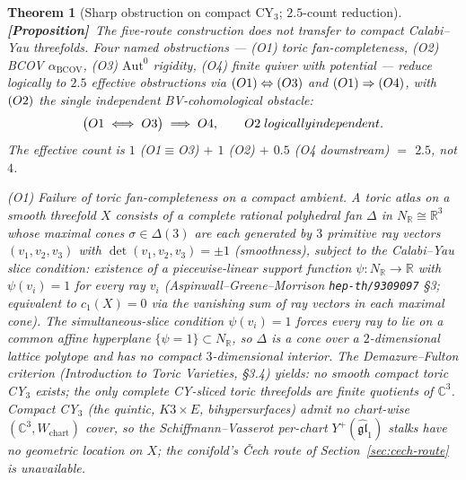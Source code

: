\documentclass[11pt]{amsart}
\newtheorem{theorem}{Theorem}[section]
\theoremstyle{definition}
\providecommand{\bR}{\mathbb{R}}
\providecommand{\bC}{\mathbb{C}}
\providecommand{\fgl}{\mathfrak{gl}}
\providecommand{\ClaimStatusProposition}{\textbf{\textsf{[Proposition]}}}
\begin{document}
\begin{theorem}[Sharp obstruction on compact CY$_3$; $2.5$-count reduction]
\label{thm:compact-obstruction}
\ClaimStatusProposition\
The five-route construction does \emph{not} transfer to compact
Calabi--Yau threefolds. Four named obstructions --- (O1) toric
fan-completeness, (O2) BCOV $\alpha_{\mathrm{BCOV}}$, (O3)
$\mathrm{Aut}^0$ rigidity, (O4) finite quiver with potential --- reduce
logically to \emph{$2.5$ effective obstructions} via
$\textup{(O1)} \Leftrightarrow \textup{(O3)}$ and $\textup{(O1)}
\Rightarrow \textup{(O4)}$, with $\textup{(O2)}$ the single
independent BV-cohomological obstacle:
\begin{equation}
\label{eq:obstruction-reduction-diagram}
\big(\textup{O1} \;\Longleftrightarrow\; \textup{O3}\big)
\;\Longrightarrow\;
\textup{O4},
\qquad
\textup{O2} \;\textup{ logically independent.}
\end{equation}
The effective count is $1$ (O1$\equiv$O3) $+$ $1$ (O2) $+$ $0.5$ (O4
downstream) $=$ $2.5$, not $4$.

\smallskip
\emph{\textup{(O1)} Failure of toric fan-completeness on a compact
ambient.}
A toric atlas on a smooth threefold $X$ consists of a complete
rational polyhedral fan $\Delta$ in $N_{\bR} \cong \bR^3$ whose
maximal cones $\sigma \in \Delta(3)$ are each generated by $3$
primitive ray vectors $(v_1, v_2, v_3)$ with $\det(v_1, v_2, v_3) =
\pm 1$ (smoothness), subject to the Calabi--Yau slice condition:
existence of a piecewise-linear support function $\psi: N_{\bR} \to
\bR$ with $\psi(v_i) = 1$ for every ray $v_i$
(Aspinwall--Greene--Morrison \texttt{hep-th/9309097} \S 3; equivalent
to $c_1(X) = 0$ via the vanishing sum of ray vectors in each maximal
cone). The simultaneous-slice condition $\psi(v_i) = 1$ forces every
ray to lie on a common affine hyperplane $\{\psi = 1\} \subset
N_{\bR}$, so $\Delta$ is a cone over a $2$-dimensional lattice
polytope and has no compact $3$-dimensional interior. The
Demazure--Fulton criterion (\emph{Introduction to Toric Varieties},
\S 3.4) yields: no smooth compact toric CY$_3$ exists; the only
complete CY-sliced toric threefolds are finite quotients of $\bC^3$.
Compact CY$_3$ (the quintic, $K3 \times E$, bihypersurfaces) admit
no chart-wise $(\bC^3, W_{\mathrm{chart}})$ cover, so the
Schiffmann--Vasserot per-chart $Y^+(\widehat{\fgl}_1)$ stalks have no
geometric location on $X$; the conifold's \v{C}ech route of
Section~\ref{sec:cech-route} is unavailable.


\end{theorem}
\end{document}
